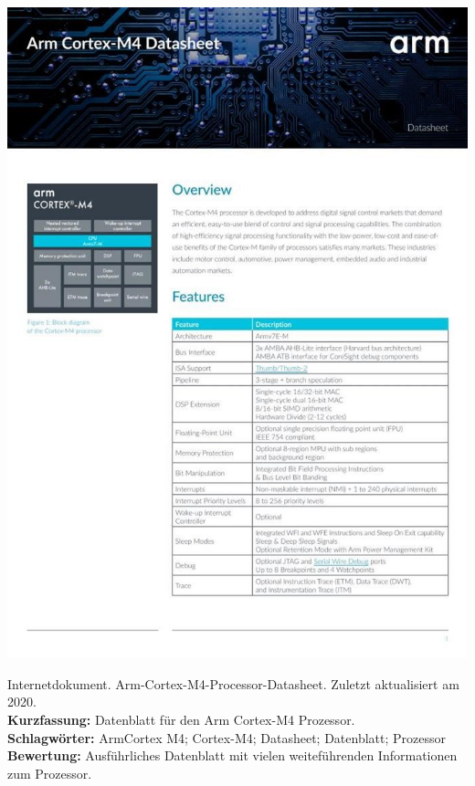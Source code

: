 {
\begin{minipage}{0.38\textwidth}
	\includegraphics[width=\linewidth]{images/Arm.jpg}
\end{minipage}
\hfill
\begin{minipage}{0.6\textwidth}
Internetdokument. Arm-Cortex-M4-Processor-Datasheet. Zuletzt aktualisiert am 2020.
\\ \textbf{Kurzfassung:}
Datenblatt für den Arm Cortex-M4 Prozessor.	
\\ \textbf{Schlagwörter:}
ArmCortex M4; Cortex-M4; Datasheet; Datenblatt; Prozessor
\\ \textbf{Bewertung:}
Ausführliches Datenblatt mit vielen weiteführenden Informationen zum Prozessor.
\end{minipage}
}

